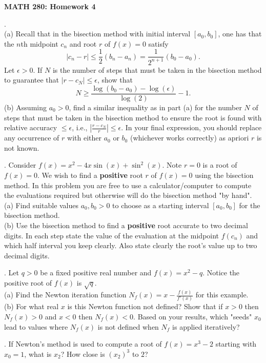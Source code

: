 \documentclass[12 pt]{article}
\begin{document}
\centerline{\bf MATH 280: Homework 4 }

\bigskip

. \\
(a) Recall that in the bisection method with initial interval $[a_0,b_0]$, one
has that the $n$th midpoint $c_n$ and root $r$ of $f(x)=0$ satisfy $$ |c_n - r |
\leq \frac{1}{2} (b_n-a_n) = \frac{1}{2^{n+1}} (b_0-a_0).
$$ Let $\epsilon > 0$. If $N$ is the number of steps that must be taken in the
bisection method to guarantee that $|r-c_N| \leq \epsilon$, show that $$ N \geq
\frac{\log(b_0-a_0)-\log(\epsilon)}{\log(2)} - 1.
$$ (b) Assuming $a_0 > 0$, find a similar inequality as in part (a) for the
number $N$ of steps that must be taken in the bisection method to ensure the
root is found with relative accuracy $\leq \epsilon$, i.e., $|\frac{r-c_N}{r}|
\leq \epsilon$. In your final expression, you should replace any occurrence of
$r$ with either $a_0$ or $b_0$ (whichever works correctly) as apriori $r$ is not
known.

\medskip

. Consider $f(x)=x^2-4x\sin(x) + \sin^2(x)$. Note $r=0$ is a root of
$f(x)=0$.
We wish to find a {\bf positive} root $r$ of $f(x)=0$ using the bisection
method. In this problem you are free to use a calculator/computer to compute the
evaluations required but otherwise will do the bisection method "by hand". \\
(a) Find suitable values $a_0, b_0 > 0$ to choose as a starting interval
$[a_0,b_0]$ for the bisection method.  \\
(b) Use the bisection method to find a {\bf positive} root accurate to two
decimal digits. In each step state the value of the evaluation at the midpoint
$f(c_n)$ and which half interval you keep clearly. Also state clearly the root's
value up to two decimal digits.

\medskip
{}. Let $q > 0$ be a fixed positive real number and $f(x)=x^2-q$.
Notice the positive root of $f(x)$ is $\sqrt{q}$.
\\
(a) Find the Newton iteration function $N_f(x) = x - \frac{f(x)}{f'(x)}$ for
this example. \\
(b) For what real $x$ is this Newton function not defined? Show that if $x > 0$
then $N_f(x) > 0$ and $x<0$ then $N_f(x)<0$.
Based on your results, which "seeds" $x_0$ lead to values where $N_f(x)$ is not
defined when $N_f$ is applied iteratively? 

\medskip

. If Newton's method is used to compute a root of $f(x)=x^3-2$
starting with $x_0=1$, what is $x_2$? How close is $(x_2)^3$ to $2$?
\end{document}
